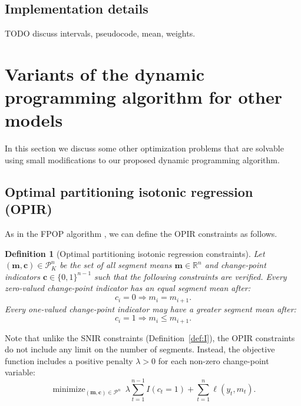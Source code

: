 \documentclass{article}
\newtheorem{definition}{Definition}
\DeclareMathOperator*{\minimize}{minimize}
\newcommand{\RR}{\mathbb R}
\begin{document}
\subsection{Implementation details}

TODO discuss intervals, pseudocode, mean, weights.

\section{Variants of the dynamic programming algorithm for other models}

In this section we discuss some other optimization problems that are
solvable using small modifications to our proposed dynamic programming
algorithm.

\subsection{Optimal partitioning isotonic regression (OPIR)}

As in the FPOP algorithm \citep{johnson, FPOP}, we can define the OPIR
constraints as follows.
\begin{definition}[Optimal partitioning isotonic regression constraints]
  \label{def:P}
  Let $(\mathbf m, \mathbf c)\in\mathcal P_K^n$ be the set of all segment means
  $\mathbf m\in\RR^n$ and change-point indicators
  $\mathbf c\in\{0,1\}^{n-1}$ such that the following constraints are
  verified. 
  Every zero-valued change-point indicator has an equal segment mean
  after:
  \begin{equation}
    \label{eq:P_0}
    c_i = 0 \Rightarrow m_i = m_{i+1}.
  \end{equation}
  Every one-valued change-point indicator may have a greater segment
  mean after:
  \begin{equation}
    \label{eq:P_1}
    c_i = 1 \Rightarrow m_i \leq m_{i+1}.
  \end{equation}
\end{definition}
Note that unlike the SNIR constraints (Definition~\ref{def:I}), the
OPIR constraints do not include any limit on the number of
segments. Instead, the objective function includes a positive penalty
$\lambda>0$ for each non-zero change-point variable:
\begin{equation}
    \minimize_{
        (\mathbf m, \mathbf c)\in\mathcal P^n
      } \ 
\lambda\sum_{t=1}^{n-1} I(c_t =1)
+
\sum_{t=1}^n \ell(y_t, m_t).
\end{equation}
\end{document}
